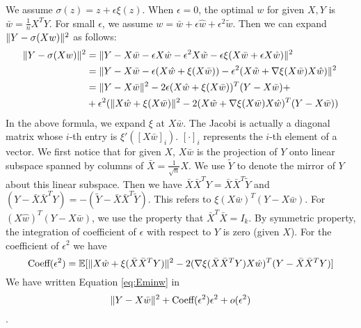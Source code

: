 \documentclass{article}
\DeclarePairedDelimiter\norm{\lVert}{\rVert}
\def\E{\mathbb{E}}
\begin{document}
We assume $\sigma(z) = z + \epsilon \xi(z)$. When $\epsilon = 0$, the optimal $w$ for given $X, Y$ is 
$\bar{w} = \frac{1}{n}X^T Y $. For small $\epsilon$, we assume $ w = \bar{w} + \epsilon \hat{w} + \epsilon^2 \tilde{w}$. Then we can expand $\norm{Y - \sigma (X w ) }^2$ as follows:
\begin{align*}
\norm{Y - \sigma (X w ) }^2 & = \norm{Y - X \bar{w} - \epsilon X \hat{w} - \epsilon^2 X \tilde{w} - \epsilon \xi(X \bar{w} + \epsilon X\hat{w}) }^2 \\
& = \norm{ Y - X  \bar{w}  - \epsilon (X\hat{w} + \xi(X \bar{w} )) - \epsilon^2(X\tilde{w} + \nabla \xi(X \bar{w} )X\hat{w})}^2 \\
& = \norm{Y-X \bar{w}  }^2 - 2 \epsilon (X \hat{w} + \xi(X \bar{w}))^T (Y-X \bar{w}) +\\
& +\epsilon^2(\norm{X\hat{w} + \xi(X \bar{w})}^2 - 2 (X \tilde{w}+ \nabla \xi(X \bar{w})X\hat{w})^T(Y-X \bar{w}))
\end{align*}
In the above formula,  we expand $\xi$ at $X \bar{w}$. The Jacobi is actually a diagonal matrix whose $i$-th entry is $\xi'([X\bar{w}]_i)$. $[\cdot]_i$ represents the $i$-th element of a vector.
We first notice that for given $X$, $X\bar{w}$ is the projection of $Y$ onto linear subspace spanned by columns of $\bar{X} = \frac{1}{\sqrt{n}}X$. We use $\tilde{Y}$ to denote the mirror of $Y$ about this linear subspace. Then we have
$\bar{X}\bar{X}^T Y = \bar{X}\bar{X}^T \tilde{Y}$ and $(Y- \bar{X}\bar{X}^TY) = -(\tilde{Y} - \bar{X}\bar{X}^T \tilde{Y})$. This refers to $\xi(X\bar{w})^T (Y-X\bar{w})$. For $(X\hat{w})^T (Y-X\bar{w})$, we use the property that $  \bar{X}^T \bar{X} = I_k$.
By symmetric property, the integration of coefficient of $\epsilon$ with respect to $Y$ is zero (given $X$). 
 For the coefficient of $\epsilon^2$ we have
\begin{equation*}
\textrm{Coeff}(\epsilon^2)  =  \E[\norm{X\hat{w} + \xi(\bar{X}\bar{X}^TY)}^2 - 2 (\nabla \xi(\bar{X}\bar{X}^TY)X\hat{w})^T(Y-\bar{X}\bar{X}^TY)]
\end{equation*}
We have written Equation \eqref{eq:Eminw} in $$ \norm{Y - X \bar{w}}^2 + \textrm{Coeff}(\epsilon^2) \epsilon^2 + o(\epsilon^2)$$.
\end{document}
